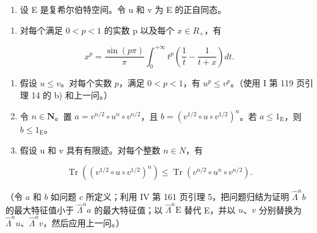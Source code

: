 \begin{enumerate}
\def\labelenumi{\arabic{enumi})}
\setcounter{enumi}{21}
\tightlist
\item
  设 E 是复希尔伯特空间。令 u 和 v 为 E 的正自同态。
\end{enumerate}

\begin{enumerate}
\def\labelenumi{\alph{enumi})}
\tightlist
\item
  对每个满足 \(0 < p < 1\) 的实数 p 以及每个 \(x \in R_{+}\)，有
\end{enumerate}

\[
x ^ {p} = \frac {\sin (p \pi)}{\pi} \int_ {0} ^ {+ \infty} t ^ {p} \left(\frac {1}{t} - \frac {1}{t + x}\right) d t.
\]

\begin{enumerate}
\def\labelenumi{\alph{enumi})}
\setcounter{enumi}{1}
\item
  假设 \(u \leqslant v\)。对每个实数 \(p\)，满足 \(0 < p < 1\)，有 \(u^p \leqslant v^p\)。（使用 I 第 119 页引理 14 的 b) 和上一问。）\\
\item
  令 \(n \in \mathbf{N}\)。置 \(a = v^{n/2} \circ u^n \circ v^{n/2}\)，且 \(b = (v^{1/2} \circ u \circ v^{1/2})^n\)。若 \(a \leqslant 1_{\mathrm{E}}\)，则 \(b \leqslant 1_{\mathrm{E}}\)。
\item
  假设 u 和 v 具有有限迹。对每个整数 \(n \in N\)，有
\end{enumerate}

\[
\operatorname{Tr} \left(\left(v ^ {1 / 2} \circ u \circ v ^ {1 / 2}\right) ^ {n}\right) \leqslant \operatorname{Tr} \left(v ^ {n / 2} \circ u ^ {n} \circ v ^ {n / 2}\right).
\]

（令 \(a\) 和 \(b\) 如问题 \(c\) 所定义；利用 IV 第 161 页引理 5，把问题归结为证明 \(\widehat{\Lambda}^{n}b\) 的最大特征值小于 \(\widehat{\Lambda}^{n}a\) 的最大特征值；以 \(\widehat{\Lambda}^{n}\mathrm{E}\) 替代 E，并以 \(u\)、\(v\) 分别替换为 \(\widehat{\Lambda}^{n}u\)、\(\widehat{\Lambda}^{n}v\)，然后应用上一问。）
\relax{}
